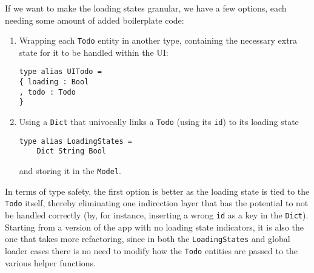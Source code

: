 If we want to make the loading states granular, we have a few options, each needing some amount of added boilerplate code:
\begin{enumerate}
    \item Wrapping each \texttt{Todo} entity in another type, containing the necessary extra state for it to be handled within the UI:
    \begin{verbatim}
type alias UITodo =
{ loading : Bool
, todo : Todo
}
    \end{verbatim}
    \item Using a \texttt{Dict} that univocally links a \texttt{Todo} (using its \texttt{id}) to its loading state
    \begin{verbatim}
type alias LoadingStates =
    Dict String Bool
    \end{verbatim}
    and storing it in the \texttt{Model}.
\end{enumerate} 
In terms of type safety, the first option is better as the loading state is tied to the \texttt{Todo} itself, thereby eliminating one indirection layer that has the potential to not be handled correctly (by, for instance, inserting a wrong \texttt{id} as a key in the \texttt{Dict}).\\
Starting from a version of the app with no loading state indicators, it is also the one that takes more refactoring, since in both the \texttt{LoadingStates} and global loader cases there is no need to modify how the \texttt{Todo} entities are passed to the various helper functions.\\

